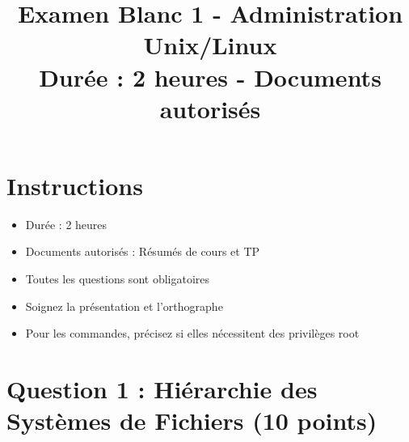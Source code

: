 \documentclass[12pt,a4paper]{article}
\title{\textbf{Examen Blanc 1 - Administration Unix/Linux}\\
\large Durée : 2 heures - Documents autorisés}
\author{}
\date{}
\begin{document}
\maketitle
\thispagestyle{fancy}

\section*{Instructions}
\begin{itemize}
    \item Durée : 2 heures
    \item Documents autorisés : Résumés de cours et TP
    \item Toutes les questions sont obligatoires
    \item Soignez la présentation et l'orthographe
    \item Pour les commandes, précisez si elles nécessitent des privilèges root
\end{itemize}

\newpage


\section{Question 1 : Hiérarchie des Systèmes de Fichiers (10 points)}
\end{document}
